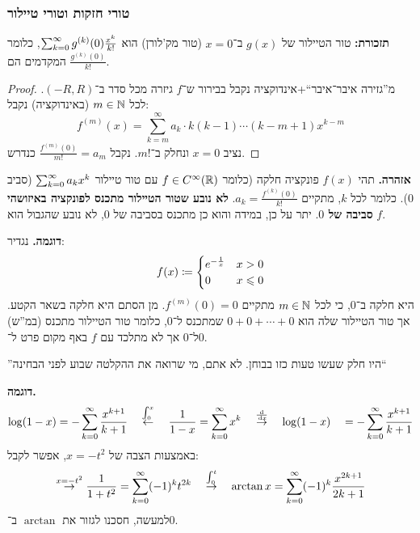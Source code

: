 \documentclass[name=רשימות חדו''א 2א]{../../../tex/classes/noChapterMegasumPreamble}
\begin{document}
\subsubsection{טורי חזקות וטורי טיילור}
	\textbf{תזכורת: }טור הטיילור של $g(x)$ ב־$x =0$ (טור מק'לורן) הוא $\sum_{k = 0}^{\infty} g^{(k)}(0) \frac{x^{k}}{k!}$, כלומר המקדמים הם $\frac{g^{(k)}(0)}{k!}$.
	\begin{proof}
		מ''גזירה איבר־איבר``+אינדוקציה נקבל בבירור ש־$f$ גיזרה מכל סדר ב־$(-R, R)$. לכל $m \in \mathbb{N}$ (באינדוקציה) נקבל:
		\[ f^{(m)}(x) = \sum_{k = m}^{\infty} a_k \cdot k(k -1)\cdots (k - m + 1)x^{k - m} \]
		נציב $x = 0$ ונחלק ב־$m!$. נקבל $\frac{f^{(m)}(0)}{m!} = a_m$ כנדרש.
	\end{proof}
	\color{red}\textbf{אזהרה. }\color{black}תהי $f(x)$ פונקציה חלקה (כלומר $f \in C^{\infty}(\mathbb{R})$ עם טור טיילור $\sum_{k = 0}^{\infty} a_kx^{k}$ (סביב $0$). כלומר לכל $k$, מתקיים $a_k = \frac{f^{(k)}(0)}{k!}$. \textbf{לא נובע שטור הטיילור מתכנס לפונקציה באיזושהי סביבה של $0$}. יתר על כן, במידה והוא כן מתכנס בסביבה של $0$, לא נובע שהגבול הוא $f$.

	\textbf{דוגמה. }נגדיר:
	\[ f(x) \coloneqq \begin{cases}
		e^{-\frac{1}{x}} & x > 0\\
		0 & x \leqslant 0
	\end{cases} \]
	היא חלקה ב־$0$, כי לכל $m \in \mathbb{N}$ מתקיים $f^{(m)}(0) = 0$. מן הסתם היא חלקה בשאר הקטע. אך טור הטיילור שלה הוא $0 + 0 + \cdots + 0$ שמתכנס ל־$0$, כלומר טור הטיילור מתכנס (במ''ש) ל־$0$ אך לא מתלכד עם $f$ באף מקום פרט ל־$0$.


	''היו חלק שעשו טעות כזו בבוחן. לא אתם, מי שרואה את ההקלטה שבוע לפני הבחינה``

	\textbf{דוגמה. }
	\[ \log(1 - x) = -\sum_{k = 0}^{\infty} \frac{x^{k + 1}}{k + 1} \quad \overset{\int_0^{x}}{\leftarrow}\quad  \frac{1}{1 - x} =\sum_{k = 0}^{\infty} x^{k} \quad \overset{\frac{\mathrm{d}}{\,\mathrm{d}x}}{\to}\quad  \log(1 - x)\quad  = -\sum_{k = 0}^{\infty} \frac{x^{k + 1}}{k + 1} \]
	באמצעות הצבה של $x = -t^{2}$, אפשר לקבל:
	\[ \overset{x = -t^{2}}{\to}\frac{1}{1 + t^{2}} = \sum_{k = 0}^{\infty} (-1)^{k}t^{2k} \quad \overset{\int^{t}_0}{\to} \quad \arctan x = \sum_{k = 0}^{\infty} (-1)^{k}\frac{x^{2k + 1}}{2k + 1} \]
	למעשה, חסכנו לגזור את $\arctan$ ב־$0$.
\end{document}
